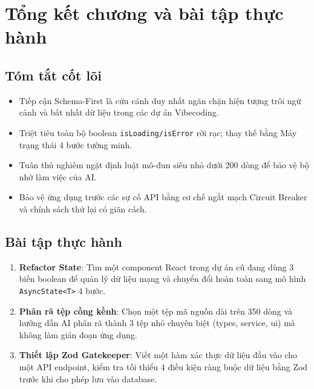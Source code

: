\documentclass[a4paper,11pt]{article}
\begin{document}
\section{Tổng kết chương và bài tập thực hành}

\subsection{Tóm tắt cốt lõi}
\begin{itemize}[leftmargin=1.5em]
    \item Tiếp cận Schema-First là cứu cánh duy nhất ngăn chặn hiện tượng trôi ngữ cảnh và bất nhất dữ liệu trong các dự án Vibecoding.
    \item Triệt tiêu toàn bộ boolean \texttt{isLoading/isError} rời rạc; thay thế bằng Máy trạng thái 4 bước tường minh.
    \item Tuân thủ nghiêm ngặt định luật mô-đun siêu nhỏ dưới 200 dòng để bảo vệ bộ nhớ làm việc của AI.
    \item Bảo vệ ứng dụng trước các sự cố API bằng cơ chế ngắt mạch Circuit Breaker và chính sách thử lại có giãn cách.
\end{itemize}

\subsection{Bài tập thực hành}
\begin{enumerate}[label={\arabic*.}]
    \item \textbf{Refactor State}: Tìm một component React trong dự án cũ đang dùng 3 biến boolean để quản lý dữ liệu mạng và chuyển đổi hoàn toàn sang mô hình \texttt{AsyncState<T>} 4 bước.
    \item \textbf{Phân rã tệp cồng kềnh}: Chọn một tệp mã nguồn dài trên 350 dòng và hướng dẫn AI phân rã thành 3 tệp nhỏ chuyên biệt (types, service, ui) mà không làm gián đoạn ứng dụng.
    \item \textbf{Thiết lập Zod Gatekeeper}: Viết một hàm xác thực dữ liệu đầu vào cho một API endpoint, kiểm tra tối thiểu 4 điều kiện ràng buộc dữ liệu bằng Zod trước khi cho phép lưu vào database.
\end{enumerate}
\end{document}
